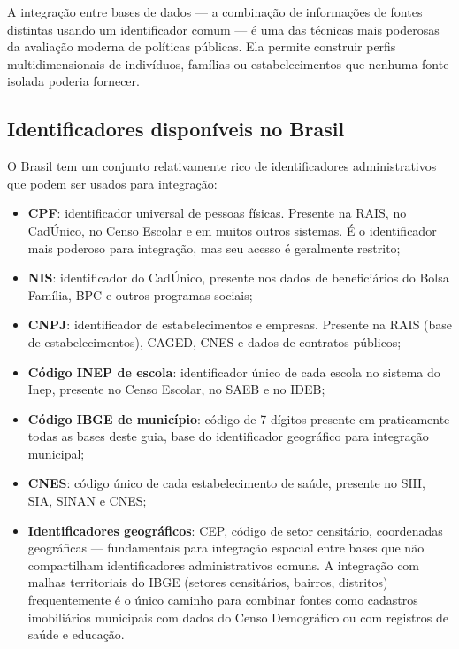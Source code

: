 A integração entre bases de dados --- a combinação de informações de fontes distintas usando um identificador comum --- é uma das técnicas mais poderosas da avaliação moderna de políticas públicas. Ela permite construir perfis multidimensionais de indivíduos, famílias ou estabelecimentos que nenhuma fonte isolada poderia fornecer.

\subsection{Identificadores disponíveis no Brasil}

O Brasil tem um conjunto relativamente rico de identificadores administrativos que podem ser usados para integração:

\begin{itemize}
  \item \textbf{CPF}: identificador universal de pessoas físicas. Presente na RAIS, no CadÚnico, no Censo Escolar e em muitos outros sistemas. É o identificador mais poderoso para integração, mas seu acesso é geralmente restrito;

  \item \textbf{NIS}: identificador do CadÚnico, presente nos dados de beneficiários do Bolsa Família, BPC e outros programas sociais;

  \item \textbf{CNPJ}: identificador de estabelecimentos e empresas. Presente na RAIS (base de estabelecimentos), CAGED, CNES e dados de contratos públicos;

  \item \textbf{Código INEP de escola}: identificador único de cada escola no sistema do Inep, presente no Censo Escolar, no SAEB e no IDEB;

  \item \textbf{Código IBGE de município}: código de 7 dígitos presente em praticamente todas as bases deste guia, base do identificador geográfico para integração municipal;

  \item \textbf{CNES}: código único de cada estabelecimento de saúde, presente no SIH, SIA, SINAN e CNES;

  \item \textbf{Identificadores geográficos}: CEP, código de setor censitário, coordenadas geográficas --- fundamentais para integração espacial entre bases que não compartilham identificadores administrativos comuns. A integração com malhas territoriais do IBGE (setores censitários, bairros, distritos) frequentemente é o único caminho para combinar fontes como cadastros imobiliários municipais com dados do Censo Demográfico ou com registros de saúde e educação.
\end{itemize}

